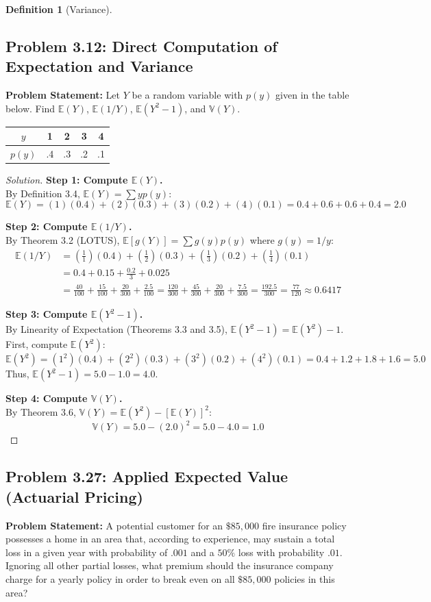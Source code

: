 \documentclass[11pt,letterpaper]{article}
\theoremstyle{definition}
\newtheorem{definition}{Definition}[section]
\theoremstyle{plain}
\theoremstyle{remark}
\newcommand{\E}{\mathbb{E}}
\newcommand{\V}{\mathbb{V}}
\begin{document}
\begin{definition}[Variance]
\subsection{Problem 3.12: Direct Computation of Expectation and Variance}
\textbf{Problem Statement:} Let $Y$ be a random variable with $p(y)$ given in the table below. Find $\E(Y)$, $\E(1/Y)$, $\E(Y^2 - 1)$, and $\V(Y)$.
\begin{center}
\begin{tabular}{c|cccc}
$y$ & 1 & 2 & 3 & 4 \\
\hline
$p(y)$ & .4 & .3 & .2 & .1
\end{tabular}
\end{center}

\begin{proof}[Solution]
\textbf{Step 1: Compute $\E(Y)$.}\\
By Definition 3.4, $\E(Y) = \sum y p(y)$:
\[ \E(Y) = (1)(0.4) + (2)(0.3) + (3)(0.2) + (4)(0.1) = 0.4 + 0.6 + 0.6 + 0.4 = 2.0 \]

\textbf{Step 2: Compute $\E(1/Y)$.}\\
By Theorem 3.2 (LOTUS), $\E[g(Y)] = \sum g(y) p(y)$ where $g(y) = 1/y$:
\begin{align*}
\E(1/Y) &= \left(\frac{1}{1}\right)(0.4) + \left(\frac{1}{2}\right)(0.3) + \left(\frac{1}{3}\right)(0.2) + \left(\frac{1}{4}\right)(0.1) \\
&= 0.4 + 0.15 + \frac{0.2}{3} + 0.025 \\
&= \frac{40}{100} + \frac{15}{100} + \frac{20}{300} + \frac{2.5}{100} = \frac{120}{300} + \frac{45}{300} + \frac{20}{300} + \frac{7.5}{300} = \frac{192.5}{300} = \frac{77}{120} \approx 0.6417
\end{align*}

\textbf{Step 3: Compute $\E(Y^2 - 1)$.}\\
By Linearity of Expectation (Theorems 3.3 and 3.5), $\E(Y^2 - 1) = \E(Y^2) - 1$.
First, compute $\E(Y^2)$:
\[ \E(Y^2) = (1^2)(0.4) + (2^2)(0.3) + (3^2)(0.2) + (4^2)(0.1) = 0.4 + 1.2 + 1.8 + 1.6 = 5.0 \]
Thus, $\E(Y^2 - 1) = 5.0 - 1.0 = 4.0$.

\textbf{Step 4: Compute $\V(Y)$.}\\
By Theorem 3.6, $\V(Y) = \E(Y^2) - [\E(Y)]^2$:
\[ \V(Y) = 5.0 - (2.0)^2 = 5.0 - 4.0 = 1.0 \]
\end{proof}

\subsection{Problem 3.27: Applied Expected Value (Actuarial Pricing)}
\textbf{Problem Statement:} A potential customer for an $\$85,000$ fire insurance policy possesses a home in an area that, according to experience, may sustain a total loss in a given year with probability of $.001$ and a $50\%$ loss with probability $.01$. Ignoring all other partial losses, what premium should the insurance company charge for a yearly policy in order to break even on all $\$85,000$ policies in this area?


\end{definition}
\end{document}
